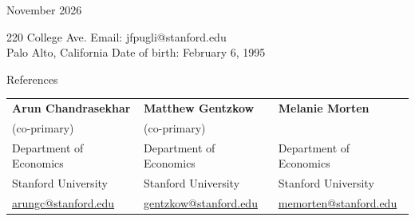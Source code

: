 \documentclass{resume} %
\begin{document}
\vspace{-\baselineskip}
\centerline{November 2026}



220 College Ave. \hfill Email: jfpugli@stanford.edu \\
Palo Alto, California \hfill Date of birth: February 6, 1995 \\



\begin{rSection}{References}

\begin{tabular}{@{}p{}p{}p{}@{}}
{\bf Arun Chandrasekhar} & {\bf Matthew Gentzkow} & {\bf Melanie Morten} \\
(co-primary) & (co-primary) & \\
Department of Economics & Department of Economics & Department of Economics \\
Stanford University & Stanford University & Stanford University \\
\href{mailto:arungc@stanford.edu}{arungc@stanford.edu} & \href{mailto:gentzkow@stanford.edu}{gentzkow@stanford.edu} & \href{mailto:memorten@stanford.edu}{memorten@stanford.edu} \\
\end{tabular}

\end{rSection}
\end{document}
